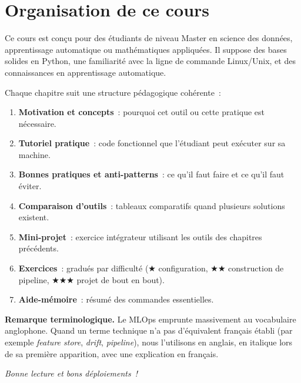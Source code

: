 \section*{Organisation de ce cours}

Ce cours est con\c{c}u pour des \'etudiants de niveau Master en science des
donn\'ees, apprentissage automatique ou math\'ematiques appliqu\'ees. Il
suppose des bases solides en Python, une familiarit\'e avec la ligne de
commande Linux/Unix, et des connaissances en apprentissage automatique.

Chaque chapitre suit une structure p\'edagogique coh\'erente~:
\begin{enumerate}
  \item \textbf{Motivation et concepts}~: pourquoi cet outil ou cette pratique
    est n\'ecessaire.
  \item \textbf{Tutoriel pratique}~: code fonctionnel que l'\'etudiant peut
    ex\'ecuter sur sa machine.
  \item \textbf{Bonnes pratiques et anti-patterns}~: ce qu'il faut faire et
    ce qu'il faut \'eviter.
  \item \textbf{Comparaison d'outils}~: tableaux comparatifs quand plusieurs
    solutions existent.
  \item \textbf{Mini-projet}~: exercice int\'egrateur utilisant les outils des
    chapitres pr\'ec\'edents.
  \item \textbf{Exercices}~: gradu\'es par difficult\'e
    ($\bigstar$ configuration, $\bigstar\bigstar$ construction de pipeline,
    $\bigstar\bigstar\bigstar$ projet de bout en bout).
  \item \textbf{Aide-m\'emoire}~: r\'esum\'e des commandes essentielles.
\end{enumerate}

\medskip
\noindent\textbf{Remarque terminologique.}
Le MLOps emprunte massivement au vocabulaire anglophone. Quand un terme
technique n'a pas d'\'equivalent fran\c{c}ais \'etabli (par exemple
\emph{feature store}, \emph{drift}, \emph{pipeline}), nous l'utilisons en
anglais, en italique lors de sa premi\`ere apparition, avec une explication
en fran\c{c}ais.

\vfill
\noindent\textit{Bonne lecture et bons d\'eploiements~!}
